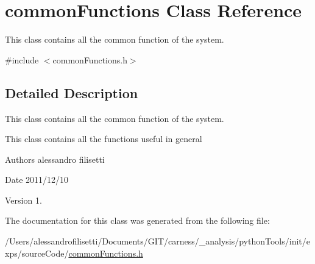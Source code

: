 \hypertarget{a00012}{\section{common\+Functions Class Reference}
\label{a00012}
}


This class contains all the common function of the system.  




{\ttfamily \#include $<$common\+Functions.\+h$>$}



\subsection{Detailed Description}
This class contains all the common function of the system. 

This class contains all the functions useful in general \begin{DoxyAuthor}{Authors}
alessandro filisetti 
\end{DoxyAuthor}
\begin{DoxyDate}{Date}
2011/12/10 
\end{DoxyDate}
\begin{DoxyVersion}{Version}
1. 
\end{DoxyVersion}


The documentation for this class was generated from the following file\+:\begin{DoxyCompactItemize}
\item 
/\+Users/alessandrofilisetti/\+Documents/\+G\+I\+T/carness/\+\_\+analysis/python\+Tools/init/exps/source\+Code/\hyperlink{a00058}{common\+Functions.\+h}\end{DoxyCompactItemize}
